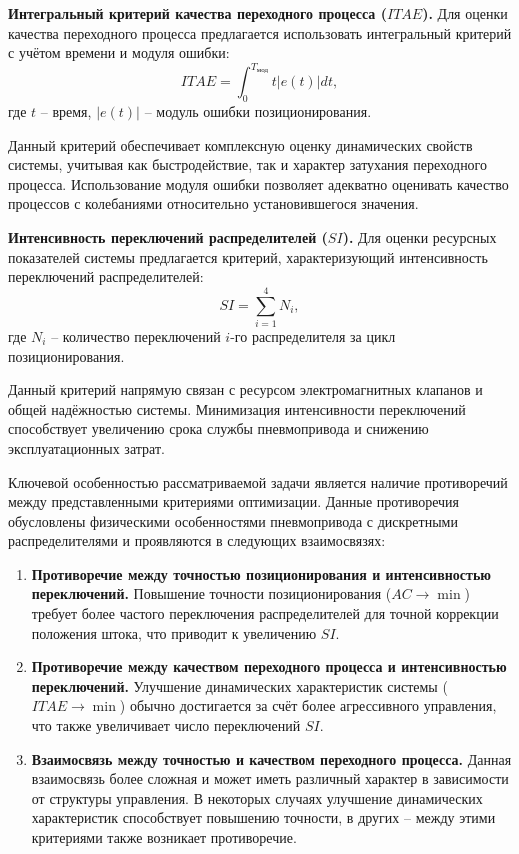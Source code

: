 \textbf{Интегральный критерий качества переходного процесса ($ITAE$).}
Для оценки качества переходного процесса предлагается использовать интегральный критерий с учётом времени и модуля ошибки:
\begin{equation}
	ITAE = \int_0^{T_{\text{мод}}} t |e(t)| dt,
\end{equation}
где $t$ -- время, $|e(t)|$ -- модуль ошибки позиционирования.

Данный критерий обеспечивает комплексную оценку динамических свойств системы, учитывая как
быстродействие, так и характер затухания переходного процесса. Использование модуля ошибки
позволяет адекватно оценивать качество процессов с колебаниями относительно установившегося значения.

\textbf{Интенсивность переключений распределителей ($SI$).}
Для оценки ресурсных показателей системы предлагается критерий,
характеризующий интенсивность переключений распределителей:
\begin{equation}
	SI = \sum_{i=1}^4 N_i,
\end{equation}
где $N_i$ -- количество переключений $i$-го распределителя за цикл позиционирования.

Данный критерий напрямую связан с ресурсом электромагнитных клапанов и общей надёжностью системы.
Минимизация интенсивности переключений способствует увеличению срока службы пневмопривода и снижению эксплуатационных затрат.

Ключевой особенностью рассматриваемой задачи является наличие противоречий между представленными критериями
оптимизации. Данные противоречия обусловлены физическими особенностями пневмопривода с дискретными распределителями и проявляются в следующих взаимосвязях:

\begin{enumerate}
	\item \textbf{Противоречие между точностью позиционирования и интенсивностью переключений.} Повышение
	      точности позиционирования ($AC \to \min$) требует более частого переключения распределителей
	      для точной коррекции положения штока, что приводит к увеличению $SI$.

	\item \textbf{Противоречие между качеством переходного процесса и интенсивностью переключений.}
	      Улучшение динамических характеристик системы ($ITAE \to \min$) обычно достигается за счёт
	      более агрессивного управления, что также увеличивает число переключений $SI$.

	\item \textbf{Взаимосвязь между точностью и качеством переходного процесса.} Данная взаимосвязь более сложная и может иметь
	      различный характер в зависимости от структуры управления. В некоторых случаях улучшение динамических
	      характеристик способствует повышению точности, в других -- между этими критериями также возникает противоречие.
\end{enumerate}

